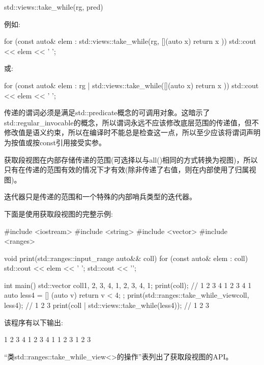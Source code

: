 \begin{cpp}
std::views::take_while(rg, pred)
\end{cpp}

例如:

\begin{cpp}
for (const auto& elem : std::views::take_while(rg, [](auto x) {
						return x %
					})) {
	std::cout << elem << ' ';
}
\end{cpp}

或:

\begin{cpp}
for (const auto& elem : rg | std::views::take_while([](auto x) {
						return x %
					})) {
	std::cout << elem << ' ';
}
\end{cpp}

传递的谓词必须是满足std::predicate概念的可调用对象。这暗示了std::regular\_invocable的概念，所以谓词永远不应该修改底层范围的传递值，但不修改值是语义约束，所以在编译时不能总是检查这一点，所以至少应该将谓词声明为按值或按const引用接受实参。

获取段视图在内部存储传递的范围(可选择以与all()相同的方式转换为视图)，所以只有在传递的范围有效的情况下才有效(除非传递了右值，则在内部使用了归属视图)。

迭代器只是传递的范围和一个特殊的内部哨兵类型的迭代器。

下面是使用获取段视图的完整示例:


\begin{cpp}
#include <iostream>
#include <string>
#include <vector>
#include <ranges>

void print(std::ranges::input_range auto&& coll)
{
	for (const auto& elem : coll) {
		std::cout << elem << ' ';
	}
	std::cout << '\n';
}

int main()
{
	std::vector coll{1, 2, 3, 4, 1, 2, 3, 4, 1};
	print(coll); // 1 2 3 4 1 2 3 4 1
	auto less4 = [] (auto v) { return v < 4; };
	print(std::ranges::take_while_view{coll, less4}); // 1 2 3
	print(coll | std::views::take_while(less4)); // 1 2 3
}
\end{cpp}

该程序有以下输出:

\begin{shell}
1 2 3 4 1 2 3 4 1
1 2 3
1 2 3
\end{shell}


“类std::ranges::take\_while\_view<>的操作”表列出了获取段视图的API。

